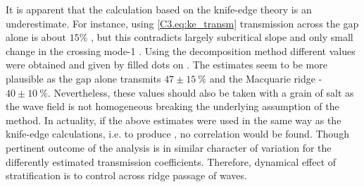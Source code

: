 \documentclass[12pt]{article}
\begin{document}
It is apparent that the calculation based on the knife-edge theory is an underestimate. For 
instance, using \eqref{C3.eq:ke_transm} transmission across the gap alone is about $15\%$ 
, but this contradicts largely subcritical slope and only small  
change in the crossing mode-1 . Using the decomposition method 
different values were obtained and given by filled dots on . The 
estimates seem to be more plausible as the gap alone 
transmits $47 \pm 15~\%$ and the Macquarie ridge - $40 \pm 10~\%$. Nevertheless, these values 
should also 
be taken with a grain of salt as the wave field is not homogeneous breaking the 
underlying assumption of the method. In actuality, if the above estimates were used in the same way 
as the knife-edge calculations, i.e. to produce , no correlation 
would be found. Though pertinent outcome of the analysis is in similar character of variation for 
the differently estimated transmission coefficients. Therefore, dynamical effect of stratification 
is to control across ridge passage of waves.\\
\end{document}
